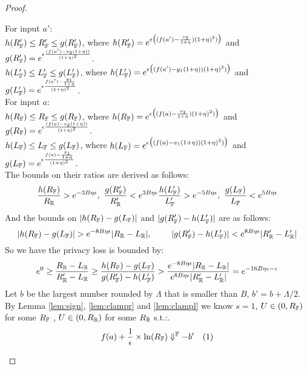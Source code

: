 \documentclass[a4paper,11pt]{article}
\begin{document}
\begin{proof}
\begin{itemize}
		For input $a'$:
		\\
		$h(R_{\mathbb{F}}') \leq R_{\mathbb{F}}' \leq g(R_{\mathbb{F}}')$, 
		where
		$h(R_{\mathbb{F}}') = e^{\epsilon 
		\big( (f(a') - \frac{v_2}{1 + \eta}) (1 + \eta)^2) \big)}$
		and 
		$g(R_{\mathbb{F}}') = e^{\epsilon 
		\frac{(f(a') - v_2(1 + \eta))}{(1 + \eta)^2}}$.
		\\
		$h(L_{\mathbb{F}}') \leq L_{\mathbb{F}}' \leq g(L_{\mathbb{F}}')$, 
		where
		$h(L_{\mathbb{F}}') = e^{\epsilon 
		\big( (f(a') - y_1(1 + \eta)) (1 + \eta)^2) \big)}$
		and 
		$g(L_{\mathbb{F}}') = e^{\epsilon 
				\frac{f(a') - \frac{y_1}{1 + \eta}}{(1 + \eta)^2}}$.
		\\
		For input $a$:
		\\
		$h(R_{\mathbb{F}}) \leq R_{\mathbb{F}} \leq g(R_{\mathbb{F}})$, 
		where
		$h(R_{\mathbb{F}}) = e^{\epsilon 
				\big( (f(a) - \frac{v_2}{1 + \eta}) (1 + \eta)^2) \big)}$
		and 
		$g(R_{\mathbb{F}}) = e^{\epsilon 
				\frac{(f(a) - v_2(1 + \eta))}{(1 + \eta)^2}}$.
		\\
		$h(L_{\mathbb{F}}) \leq L_{\mathbb{F}} \leq g(L_{\mathbb{F}})$, 
		where
		$h(L_{\mathbb{F}}) = e^{\epsilon 
				\big( (f(a) - v_1(1 + \eta)) (1 + \eta)^2) \big)}$
		and 
		$g(L_{\mathbb{F}}) = e^{\epsilon 
				\frac{f(a) - \frac{v_1}{1 + \eta}}{(1 + \eta)^2}}$.
		\\
		The bounds on their ratios are derived as follows:
		\[
		\frac{h(R_{\mathbb{F}})}{R_{\mathbb{R}}} > e^{-3B\eta \epsilon}, 
		~ 
		\frac{g(R_{\mathbb{F}}')}{R_{\mathbb{R}}'} < e^{3B\eta \epsilon}
		\frac{h(L_{\mathbb{F}}')}{L_{\mathbb{F}}'} > e^{-5B\eta \epsilon}, 
		~ 
		\frac{g(L_{\mathbb{F}})}{L_{\mathbb{F}}} < e^{5B\eta \epsilon}
		\]
		And the bounds on $|h(R_{\mathbb{F}}) - g(L_{\mathbb{F}})|$
		and $|g(R_{\mathbb{F}}') - h(L_{\mathbb{F}}')|$ are as follows:
		\[
		|h(R_{\mathbb{F}}) - g(L_{\mathbb{F}})| > e^{-8 B\eta \epsilon}
		|R_{\mathbb{R}} - L_{\mathbb{R}}|, 
		~~~~~~~
		|g(R_{\mathbb{F}}') - h(L_{\mathbb{F}}')| < e^{8 B\eta \epsilon}
		|R_{\mathbb{R}}' - L_{\mathbb{R}}'|
		\]
		So we have the privacy loss is bounded by:
		\[
		e^0 
		\geq 
		\frac{R_{\mathbb{R}} - L_{\mathbb{R}}}{R_{\mathbb{R}}' - L_{\mathbb{R}}}
		\geq
		\frac{h(R_{\mathbb{F}}) - g(L_{\mathbb{F}})}
		{g(R_{\mathbb{F}}') - h(L_{\mathbb{F}}')}
		> \frac{e^{-8 B\eta \epsilon}|R_{\mathbb{R}} - L_{\mathbb{R}}|}
		{e^{8 B\eta \epsilon}|R_{\mathbb{R}}' - L_{\mathbb{R}}'|}
		= e^{-16B \eta \epsilon - \epsilon}
		\]
		Let $b$ be the largest number rounded by $\Lambda$ that is smaller than $B$, $b' = b + \Lambda / 2$.
		\\
		By Lemma \ref{lem:sign}, \ref{lem:clampr} and \ref{lem:clampl} we know $s = 1$, 
		$U \in (0, R_{\mathbb{F}})$ for some $R_{\mathbb{F}}$
		, $U \in (0, R_{\mathbb{R}})$ for some $R_{\mathbb{R}}$ s.t.:.
		$$f(a) + \frac{1}{\epsilon} \times \ln(R_{\mathbb{F}}) \Downarrow^{\mathbb{F}} -b' ~~~ (1)
$$
\end{itemize}
\end{proof}
\end{document}
